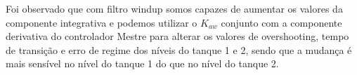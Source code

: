 Foi observado que com filtro windup somos capazes de aumentar os valores da componente integrativa
e podemos utilizar o $K_{aw}$ conjunto com a componente derivativa do controlador Mestre para alterar
os valores de overshooting, tempo de transição e erro de regime dos níveis do tanque 1 e 2, sendo que
a mudança é mais sensível no nível do tanque 1 do que no nível do tanque 2.   